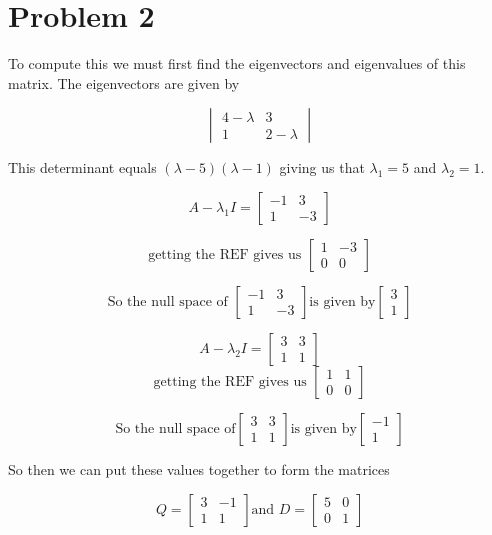 \documentclass{article}
\begin{document}
\section*{Problem 2}
To compute this we must first find the eigenvectors and eigenvalues of this matrix. The eigenvectors are given by

\[ \begin{vmatrix} 4 - \lambda & 3 \\ 1 & 2 - \lambda \end{vmatrix} \]

This determinant equals $(\lambda - 5)(\lambda - 1)$ giving us that $\lambda_1 = 5$ and $\lambda_2 = 1$. 

\[ A - \lambda_1 I = \begin{bmatrix} -1 & 3 \\ 1 & -3 \end{bmatrix} \]

\[ \text{getting the REF gives us } \begin{bmatrix} 1 & -3 \\ 0 & 0 \end{bmatrix} \]

\[ \text{So the null space of }\begin{bmatrix} -1 & 3 \\ 1 & -3 \end{bmatrix} \text{is given by} \begin{bmatrix} 3 \\ 1 \end{bmatrix} \]

\[ A - \lambda_2 I = \begin{bmatrix} 3 & 3 \\ 1 & 1 \end{bmatrix} \]
\[ \text{getting the REF gives us } \begin{bmatrix} 1 & 1 \\ 0 & 0 \end{bmatrix} \]

\[ \text{So the null space of}\begin{bmatrix} 3 & 3 \\ 1 & 1 \end{bmatrix} \text{is given by} \begin{bmatrix} -1 \\ 1 \end{bmatrix} \]

So then we can put these values together to form the matrices

\[ Q = \begin{bmatrix} 3 & -1 \\ 1 & 1 \end{bmatrix} \text{and } D = \begin{bmatrix} 5 & 0 \\ 0 & 1 \end{bmatrix} \]
\end{document}
